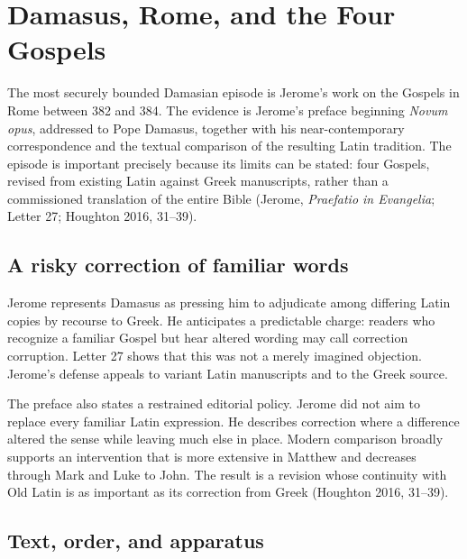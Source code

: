 \section{Damasus, Rome, and the Four Gospels}

The most securely bounded Damasian episode is Jerome's work on the Gospels in Rome between 382 and 384. The evidence is Jerome's preface beginning \emph{Novum opus}, addressed to Pope Damasus, together with his near-contemporary correspondence and the textual comparison of the resulting Latin tradition. The episode is important precisely because its limits can be stated: four Gospels, revised from existing Latin against Greek manuscripts, rather than a commissioned translation of the entire Bible (Jerome, \emph{Praefatio in Evangelia}; Letter 27; Houghton 2016, 31--39).

\subsection{A risky correction of familiar words}

Jerome represents Damasus as pressing him to adjudicate among differing Latin copies by recourse to Greek. He anticipates a predictable charge: readers who recognize a familiar Gospel but hear altered wording may call correction corruption. Letter 27 shows that this was not a merely imagined objection. Jerome's defense appeals to variant Latin manuscripts and to the Greek source.

The preface also states a restrained editorial policy. Jerome did not aim to replace every familiar Latin expression. He describes correction where a difference altered the sense while leaving much else in place. Modern comparison broadly supports an intervention that is more extensive in Matthew and decreases through Mark and Luke to John. The result is a revision whose continuity with Old Latin is as important as its correction from Greek (Houghton 2016, 31--39).


\subsection{Text, order, and apparatus}

